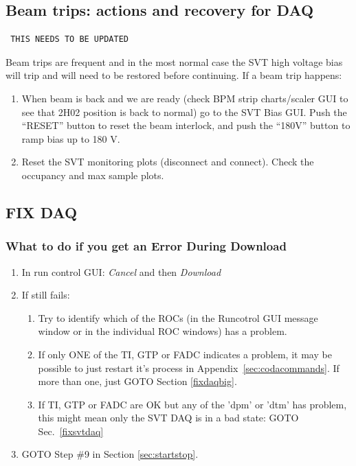 \documentclass[12pt]{article}
\begin{document}
\subsection{Beam trips: actions and recovery for DAQ}

\begin{verbatim} THIS NEEDS TO BE UPDATED \end{verbatim}

Beam trips are frequent and in the most normal case the SVT high voltage bias will trip and will need to be restored before continuing.  If a beam trip happens:
\begin{enumerate}

\item When beam is back and we are ready (check BPM strip charts/scaler GUI to see that 2H02 position is back to normal) go to the SVT Bias GUI. Push the ``RESET'' button to reset the beam interlock, and push the ``180V'' button to ramp bias up to 180 V.

\item Reset the SVT monitoring plots (disconnect and connect). Check the occupancy and max sample plots.

\end{enumerate}


\newpage
\subsection{FIX DAQ}


\subsubsection{What to do if you get an Error During Download}

\begin{enumerate}
    \item In run control GUI: {\em Cancel} and then {\em Download}
    \item If still fails:
    \begin{enumerate}
    	\item Try to identify which of the ROCs (in the Runcotrol GUI message window or in the individual ROC windows) has a problem. 
        \item If only ONE of the TI, GTP or FADC indicates a problem, it may be possible to just restart it's process in Appendix~\ref{sec:codacommands}.  If more than one, just GOTO Section \ref{fixdaqbig}.
	\item If TI, GTP or FADC are OK but any of the 'dpm' or 'dtm' has problem, this might mean only the SVT DAQ is in a bad state: GOTO Sec.~\ref{fixsvtdaq}
    \end{enumerate}
    \item GOTO Step \#9 in Section \ref{sec:startstop}.
\end{enumerate}
\end{document}
